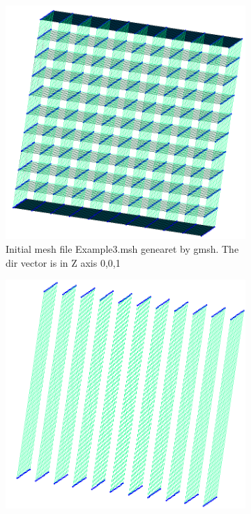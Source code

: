 \documentclass[11pt]{article}
\begin{document}
\begin{figure}[h]
  \centering
  \begin{subfigure}[b]{0.3\textwidth}
    \includegraphics[width=\textwidth]{Images/Example3-OriginalMesh.png}
    \caption{Initial mesh file Example3.msh genearet by gmsh. The dir vector is in Z axis {0,0,1} }
  \end{subfigure}\hfill
  \begin{subfigure}[b]{0.3\textwidth}
    \includegraphics[width=\textwidth]{Images/Example3-1Layer.png}

\end{subfigure}
\end{figure}
\end{document}
